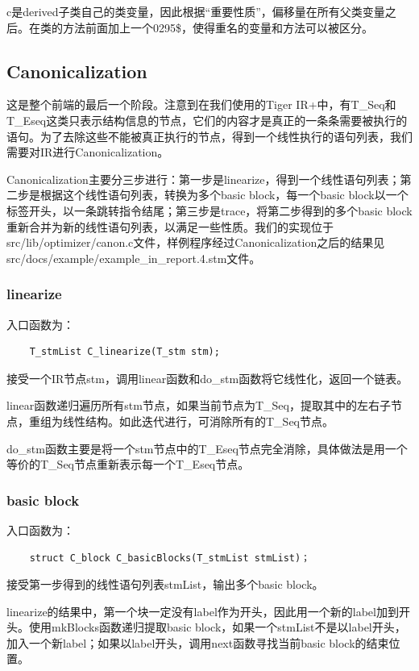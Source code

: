 \documentclass{article}
\begin{document}
c是derived子类自己的类变量，因此根据“重要性质”，偏移量在所有父类变量之后。在类的方法前面加上一个0295\$，使得重名的变量和方法可以被区分。

\subsection{Canonicalization}
这是整个前端的最后一个阶段。注意到在我们使用的Tiger IR+中，有T\_Seq和T\_Eseq这类只表示结构信息的节点，它们的内容才是真正的一条条需要被执行的语句。为了去除这些不能被真正执行的节点，得到一个线性执行的语句列表，我们需要对IR进行Canonicalization。

Canonicalization主要分三步进行：第一步是linearize，得到一个线性语句列表；第二步是根据这个线性语句列表，转换为多个basic block，每一个basic block以一个标签开头，以一条跳转指令结尾；第三步是trace，将第二步得到的多个basic block重新合并为新的线性语句列表，以满足一些性质。我们的实现位于src/lib/optimizer/canon.c文件，样例程序经过Canonicalization之后的结果见src/docs/example/example\_in\_report.4.stm文件。

\subsubsection{linearize}
入口函数为：

    \begin{lstlisting}
    T_stmList C_linearize(T_stm stm);
    \end{lstlisting}

接受一个IR节点stm，调用linear函数和do\_stm函数将它线性化，返回一个链表。

linear函数递归遍历所有stm节点，如果当前节点为T\_Seq，提取其中的左右子节点，重组为线性结构。如此迭代进行，可消除所有的T\_Seq节点。

do\_stm函数主要是将一个stm节点中的T\_Eseq节点完全消除，具体做法是用一个等价的T\_Seq节点重新表示每一个T\_Eseq节点。

\subsubsection{basic block}
入口函数为：

    \begin{lstlisting}
    struct C_block C_basicBlocks(T_stmList stmList)；
    \end{lstlisting}

接受第一步得到的线性语句列表stmList，输出多个basic block。

linearize的结果中，第一个块一定没有label作为开头，因此用一个新的label加到开头。使用mkBlocks函数递归提取basic block，如果一个stmList不是以label开头，加入一个新label；如果以label开头，调用next函数寻找当前basic block的结束位置。
\end{document}
